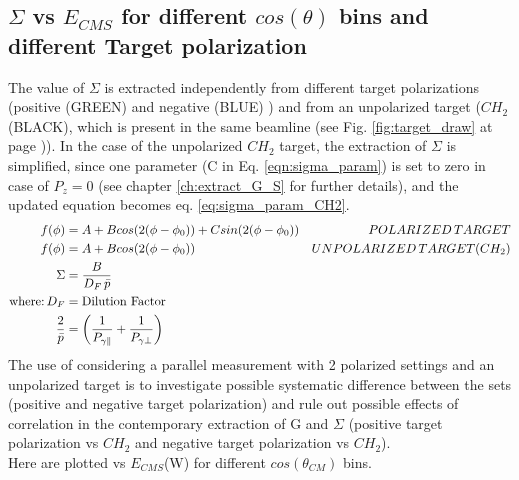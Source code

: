 \begin{figure}[htb]
\ContinuedFloat
  \begin{center} 
  \end{center}
\end{figure}

\clearpage
\newpage

\subsection{\texorpdfstring{$\Sigma$}{Sigma} vs \texorpdfstring{$E_{CMS}$}{E-CMS} for different \texorpdfstring{$cos(\theta)$}{cos(theta)} bins and different Target polarization}
\label{app:Sigma_TGPOL}
The value of $\Sigma$ is extracted independently from different target polarizations (positive (GREEN)  and negative (BLUE) ) and from an unpolarized target ($CH_2$ (BLACK), which is present in the same beamline (see Fig. \ref{fig:target_draw} at page \pageref{fig:target_draw})). In the case of the unpolarized $CH_2$ target, the extraction of $\Sigma$ is simplified, since one parameter (C in Eq. \ref{eqn:sigma_param}) is set to zero in case of $P_z=0$ (see chapter \ref{ch:extract_G_S} for further details), and the updated equation becomes eq. \ref{eq:sigma_param_CH2}. 
\begin{align}
  f(\phi) & = A + B cos(2(\phi-\phi_0)) + C sin(2(\phi-\phi_0)) & POLARIZED\, TARGET \label{eqn:sigma_param}\\
   f(\phi) & = A + B cos(2(\phi-\phi_0))  & UNPOLARIZED\, TARGET (CH_2) \label{eq:sigma_param_CH2}\\
   \Sigma & = \frac{B}{D_F \, \bar{p}} & \\
   \textnormal{where:} \, D_F & =   \textnormal{Dilution Factor} & \\
    \frac{2}{\bar{p}} & = \left(\frac{1}{P_{\gamma \parallel}} + \frac{1}{P_{\gamma \perp}}\right) &
\end{align}
The use of considering a parallel measurement with 2 polarized settings and an unpolarized target is to investigate possible systematic difference between the sets (positive and negative target polarization) and rule out possible effects of correlation in the contemporary extraction of G and $\Sigma$ (positive target polarization vs $CH_2$ and negative target polarization vs $CH_2$). \\
 Here are plotted vs $E_{CMS}$(W) for different $cos(\theta_{CM})$ bins.

